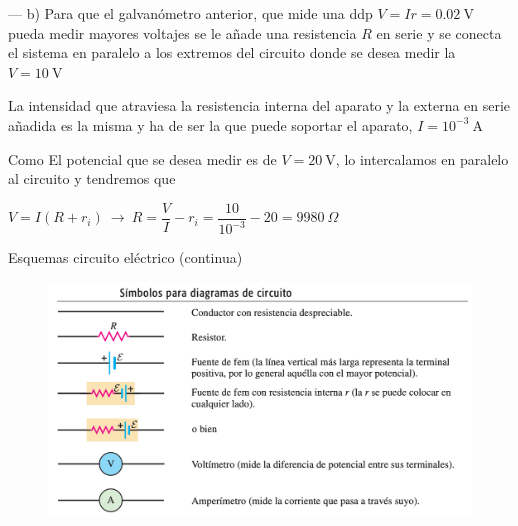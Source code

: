 --- b) Para que el galvanómetro anterior, que  mide una ddp $V=I r = 0.02 \ \mathrm{V}$ pueda medir mayores voltajes se le añade una resistencia $R$ en serie y se conecta el sistema en paralelo a los extremos del circuito donde se desea medir la $V=10\ \mathrm{V}$

La intensidad que atraviesa la resistencia interna del aparato y la externa en serie añadida es la misma y ha de ser la que puede soportar el aparato, $I=10^{-3} \ \mathrm{A}$ 

Como El potencial que se desea medir es de $V=20 \ \mathrm{V}$, lo intercalamos en paralelo al circuito y tendremos que

$V=I(R+r_i) \ \to \ R=\dfrac V I - r_i = \dfrac{10}{10^{-3}}-20=9980\ \Omega$


\newpage %


\begin{myblock}{Esquemas circuito eléctrico (continua)}
	\begin{figure}[H]
	\centering
	\includegraphics[width=1\textwidth]{imagenes/imagenes25/T25IM06.png}
\end{figure}	
\end{myblock}






